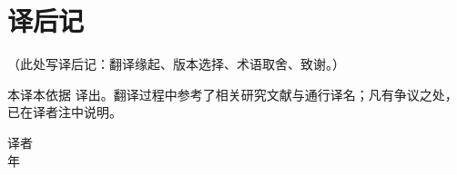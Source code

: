 \chapter*{译后记}

\begin{flushleft}

（此处写译后记：翻译缘起、版本选择、术语取舍、致谢。）

\vspace{0.8em}
本译本依据 \textit{\booktitleoriginal} 译出。翻译过程中参考了相关研究文献与通行译名；凡有争议之处，已在译者注中说明。

\vspace{1.2em}
\hfill 译者\\
\hfill \bookyear 年
\end{flushleft}
